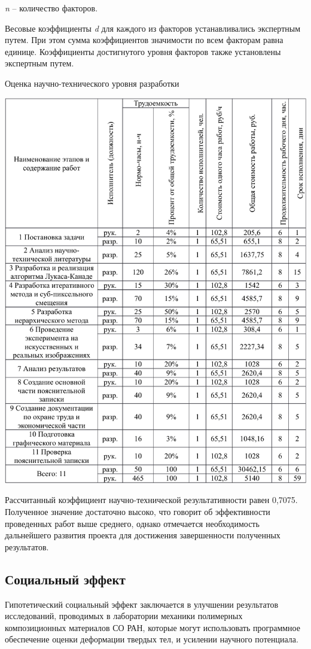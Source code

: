 

\textit{n} – количество факторов.

Весовые коэффициенты \textit{d} для каждого из факторов устанавливались экспертным путем. При этом сумма коэффициентов значимости по всем факторам равна единице. Коэффициенты достигнутого уровня факторов также установлены экспертным путем.

\begin{table}[!ht]
\caption{Оценка научно-технического уровня разработки}
\centering
\includegraphics[page=10, width=1\linewidth]{econom_table.pdf}
\label{tab:eco_10}
\end{table}
Рассчитанный коэффициент научно-технической результативности равен 0,7075. Полученное значение достаточно высоко, что говорит об эффективности проведенных работ выше среднего, однако отмечается необходимость дальнейшего развития проекта для достижения завершенности полученных результатов.

\subsection{Социальный эффект}
Гипотетический социальный эффект заключается в улучшении результатов исследований, проводимых в лаборатории механики полимерных композиционных материалов СО РАН, которые могут использовать программное обеспечение оценки деформации твердых тел, и усилении научного потенциала.